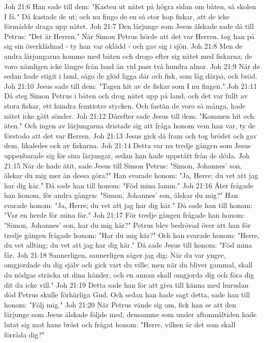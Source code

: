 Joh 21:6  Han sade till dem: "Kasten ut nätet på högra sidan om båten, så skolen I få." Då kastade de ut; och nu fingo de en så stor hop fiskar, att de icke förmådde draga upp nätet.
Joh 21:7  Den lärjunge som Jesus älskade sade då till Petrus: "Det är Herren." När Simon Petrus hörde att det var Herren, tog han på sig sin överklädnad - ty han var oklädd - och gav sig i sjön.
Joh 21:8  Men de andra lärjungarna kommo med båten och drogo efter sig nätet med fiskarna; de voro nämligen icke längre från land än vid pass två hundra alnar.
Joh 21:9  När de sedan hade stigit i land, sågo de glöd ligga där och fisk, som låg därpå, och bröd.
Joh 21:10  Jesus sade till dem: "Tagen hit av de fiskar som I nu fingen."
Joh 21:11  Då steg Simon Petrus i båten och drog nätet upp på land, och det var fullt av stora fiskar, ett hundra femtiotre stycken. Och fastän de voro så många, hade nätet icke gått sönder.
Joh 21:12  Därefter sade Jesus till dem: "Kommen hit och äten." Och ingen av lärjungarna dristade sig att fråga honom vem han var, ty de förstodo att det var Herren.
Joh 21:13  Jesus gick då fram och tog brödet och gav dem, likaledes ock av fiskarna.
Joh 21:14  Detta var nu tredje gången som Jesus uppenbarade sig för sina lärjungar, sedan han hade uppstått från de döda.
Joh 21:15  När de hade ätit, sade Jesus till Simon Petrus: "Simon, Johannes' son, älskar du mig mer än dessa göra?" Han svarade honom: "Ja, Herre; du vet att jag har dig kär." Då sade han till honom: "Föd mina lamm."
Joh 21:16  Åter frågade han honom, för andra gången: "Simon, Johannes' son, älskar du mig?" Han svarade honom: "Ja, Herre; du vet att jag har dig kär." Då sade han till honom: "Var en herde för mina får."
Joh 21:17  För tredje gången frågade han honom: "Simon, Johannes' son, har du mig kär?" Petrus blev bedrövad över att han för tredje gången frågade honom: "Har du mig kär?" Och han svarade honom: "Herre, du vet allting; du vet att jag har dig kär." Då sade Jesus till honom: "Föd mina får.
Joh 21:18  Sannerligen, sannerligen säger jag dig: När du var yngre, omgjordade du dig själv och gick vart du ville; men när du bliver gammal, skall du nödgas sträcka ut dina händer, och en annan skall omgjorda dig och föra dig dit du icke vill."
Joh 21:19  Detta sade han för att giva till känna med hurudan död Petrus skulle förhärliga Gud. Och sedan han hade sagt detta, sade han till honom: "Följ mig."
Joh 21:20  När Petrus vände sig om, fick han se att den lärjunge som Jesus älskade följde med, densamme som under aftonmåltiden hade lutat sig mot hans bröst och frågat honom: "Herre, vilken är det som skall förråda dig?"
